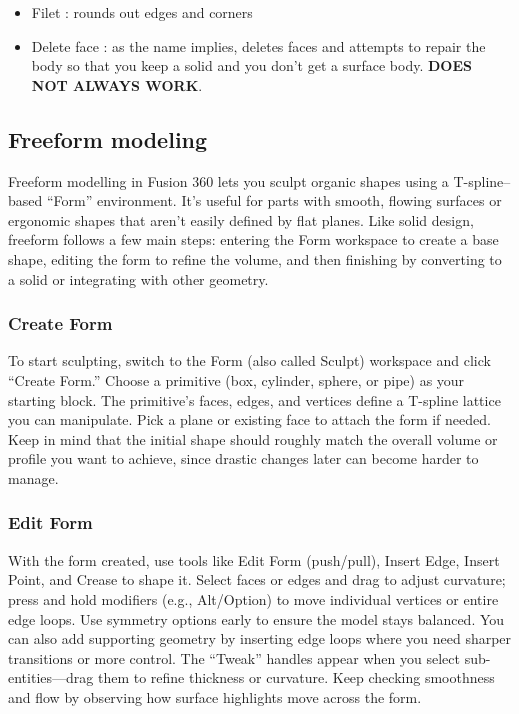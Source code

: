 \begin{itemize}
    \item Filet : rounds out edges and corners
    \item Delete face : as the name implies, deletes faces and attempts to repair the body so that you keep a solid and you don’t get a surface body. \textbf{DOES NOT ALWAYS WORK}.
\end{itemize}

\subsection{Freeform modeling}

Freeform modelling in Fusion 360 lets you sculpt organic shapes using a T-spline–based “Form” environment. It’s useful for parts with smooth, flowing surfaces or ergonomic shapes that aren’t easily defined by flat planes. Like solid design, freeform follows a few main steps: entering the Form workspace to create a base shape, editing the form to refine the volume, and then finishing by converting to a solid or integrating with other geometry.

\subsubsection{Create Form}
To start sculpting, switch to the Form (also called Sculpt) workspace and click “Create Form.” Choose a primitive (box, cylinder, sphere, or pipe) as your starting block. The primitive’s faces, edges, and vertices define a T-spline lattice you can manipulate. Pick a plane or existing face to attach the form if needed. Keep in mind that the initial shape should roughly match the overall volume or profile you want to achieve, since drastic changes later can become harder to manage.

\subsubsection{Edit Form}
With the form created, use tools like Edit Form (push/pull), Insert Edge, Insert Point, and Crease to shape it. Select faces or edges and drag to adjust curvature; press and hold modifiers (e.g., Alt/Option) to move individual vertices or entire edge loops. Use symmetry options early to ensure the model stays balanced. You can also add supporting geometry by inserting edge loops where you need sharper transitions or more control. The “Tweak” handles appear when you select sub-entities—drag them to refine thickness or curvature. Keep checking smoothness and flow by observing how surface highlights move across the form.

